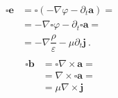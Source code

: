 \documentclass[letterpaper,10pt,english]{jupyterBook}
\begin{document}
\sphinxAtStartPar
{}
\begin{equation*}
\begin{split}\begin{aligned}
\square \mathbf{e} & = \square ( -\nabla \varphi - \partial_t \mathbf{a}) = \\
& = - \nabla \square \varphi - \partial_t \square \mathbf{a} = \\
& = - \nabla \dfrac{\rho}{\varepsilon} - \mu \partial_t \mathbf{j}  \ .
\end{aligned}\end{split}
\end{equation*}
\sphinxAtStartPar
{}
\begin{equation*}
\begin{split}\begin{aligned}
 \square \mathbf{b} & = \square \nabla \times \mathbf{a} = \\
 & = \nabla \times \square \mathbf{a} = \\
 & = \mu \nabla \times \mathbf{j}
\end{aligned}\end{split}
\end{equation*}
\sphinxstepscope
\end{document}
